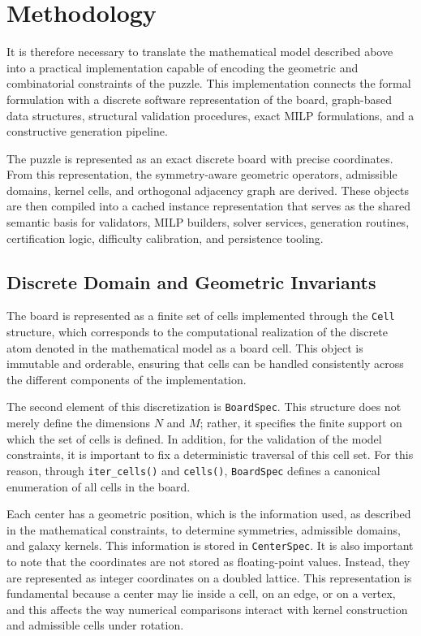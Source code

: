 \section{Methodology}

It is therefore necessary to translate the mathematical model described above into a practical implementation capable of encoding the geometric and combinatorial constraints of the puzzle. This implementation connects the formal formulation with a discrete software representation of the board, graph-based data structures, structural validation procedures, exact MILP formulations, and a constructive generation pipeline.

The puzzle is represented as an exact discrete board with precise coordinates. From this representation, the symmetry-aware geometric operators, admissible domains, kernel cells, and orthogonal adjacency graph are derived. These objects are then compiled into a cached instance representation that serves as the shared semantic basis for validators, MILP builders, solver services, generation routines, certification logic, difficulty calibration, and persistence tooling.

\subsection{Discrete Domain and Geometric Invariants}

The board is represented as a finite set of cells implemented through the \texttt{Cell} structure, which corresponds to the computational realization of the discrete atom denoted in the mathematical model as a board cell. This object is immutable and orderable, ensuring that cells can be handled consistently across the different components of the implementation.

The second element of this discretization is \texttt{BoardSpec}. This structure does not merely define the dimensions \(N\) and \(M\); rather, it specifies the finite support on which the set of cells is defined. In addition, for the validation of the model constraints, it is important to fix a deterministic traversal of this cell set. For this reason, through \texttt{iter\_cells()} and \texttt{cells()}, \texttt{BoardSpec} defines a canonical enumeration of all cells in the board.

Each center has a geometric position, which is the information used, as described in the mathematical constraints, to determine symmetries, admissible domains, and galaxy kernels. This information is stored in \texttt{CenterSpec}. It is also important to note that the coordinates are not stored as floating-point values. Instead, they are represented as integer coordinates on a doubled lattice. This representation is fundamental because a center may lie inside a cell, on an edge, or on a vertex, and this affects the way numerical comparisons interact with kernel construction and admissible cells under rotation.

